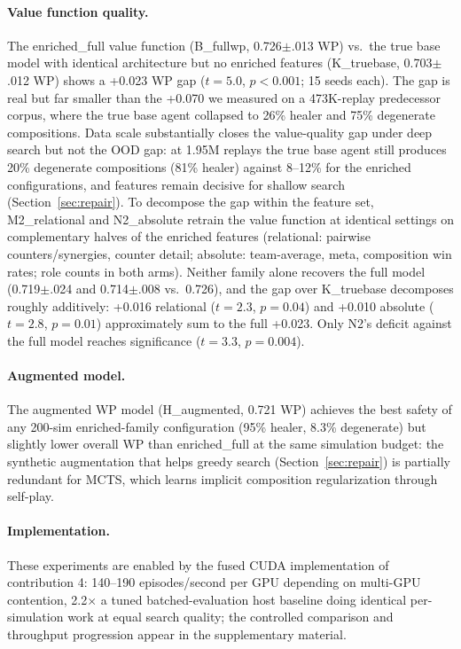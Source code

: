 \documentclass[journal]{IEEEtran}
\begin{document}
\paragraph{Value function quality.} The enriched\_full value function (B\_fullwp, 0.726$\pm$.013 WP) vs.\ the true base model with identical architecture but no enriched features (K\_truebase, 0.703$\pm$.012 WP) shows a +0.023 WP gap ($t = 5.0$, $p < 0.001$; 15 seeds each). The gap is real but far smaller than the +0.070 we measured on a 473K-replay predecessor corpus, where the true base agent collapsed to 26\% healer and 75\% degenerate compositions. Data scale substantially closes the value-quality gap under deep search but not the OOD gap: at 1.95M replays the true base agent still produces 20\% degenerate compositions (81\% healer) against 8--12\% for the enriched configurations, and features remain decisive for shallow search (Section~\ref{sec:repair}). To decompose the gap within the feature set, M2\_relational and N2\_absolute retrain the value function at identical settings on complementary halves of the enriched features (relational: pairwise counters/synergies, counter detail; absolute: team-average, meta, composition win rates; role counts in both arms). Neither family alone recovers the full model (0.719$\pm$.024 and 0.714$\pm$.008 vs.\ 0.726), and the gap over K\_truebase decomposes roughly additively: +0.016 relational ($t = 2.3$, $p = 0.04$) and +0.010 absolute ($t = 2.8$, $p = 0.01$) approximately sum to the full +0.023. Only N2's deficit against the full model reaches significance ($t = 3.3$, $p = 0.004$).
\paragraph{Augmented model.} The augmented WP model (H\_augmented, 0.721 WP) achieves the best safety of any 200-sim enriched-family configuration (95\% healer, 8.3\% degenerate) but slightly lower overall WP than enriched\_full at the same simulation budget: the synthetic augmentation that helps greedy search (Section~\ref{sec:repair}) is partially redundant for MCTS, which learns implicit composition regularization through self-play.

\paragraph{Implementation.} These experiments are enabled by the fused CUDA implementation of contribution 4: 140--190 episodes/second per GPU depending on multi-GPU contention, 2.2$\times$ a tuned batched-evaluation host baseline doing identical per-simulation work at equal search quality; the controlled comparison and throughput progression appear in the supplementary material.
\end{document}
